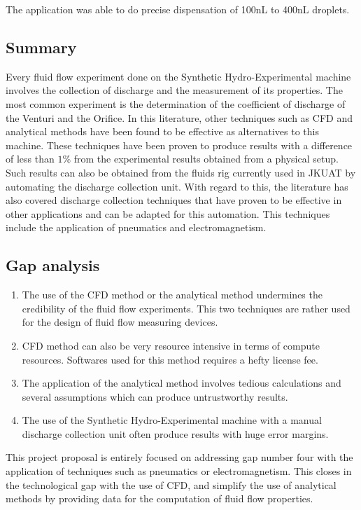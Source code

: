 The application was able to do precise dispensation of 100nL to 400nL droplets.

\subsection{Summary}

Every fluid flow experiment done on the Synthetic Hydro-Experimental machine involves the collection of discharge and the measurement of its properties. The most common experiment is the determination of the coefficient of discharge  of the Venturi and the Orifice. In this literature, other techniques such as CFD and analytical methods have been found to be effective as alternatives to this machine. These techniques have been proven to produce results with a difference of less than $1\%$  from the experimental results obtained from a physical setup. Such results can also be obtained from the fluids rig currently used in JKUAT by automating the discharge collection unit. With regard to this, the literature has also covered discharge collection techniques that have proven to be effective in other applications and can be adapted for this automation. This techniques include the application of pneumatics and electromagnetism. 

\subsection{Gap analysis}
\begin{enumerate}
    \item The use of the CFD method or the analytical method  undermines the credibility of the fluid flow experiments. This two techniques are rather used for the design of fluid flow measuring devices.
    \item CFD method can also be very resource intensive in terms of compute resources. Softwares used for this method requires a hefty license fee.
    \item The application of the analytical method involves tedious calculations and several assumptions which can produce untrustworthy results.
    \item The use of the Synthetic Hydro-Experimental machine with a manual discharge collection unit often produce results with huge error margins.  
\end{enumerate}

This project proposal is entirely focused on addressing gap number four with the application of techniques such as pneumatics or electromagnetism. This closes in the technological gap with the use of CFD, and simplify the use of analytical methods by providing data for the computation of fluid flow properties.    





